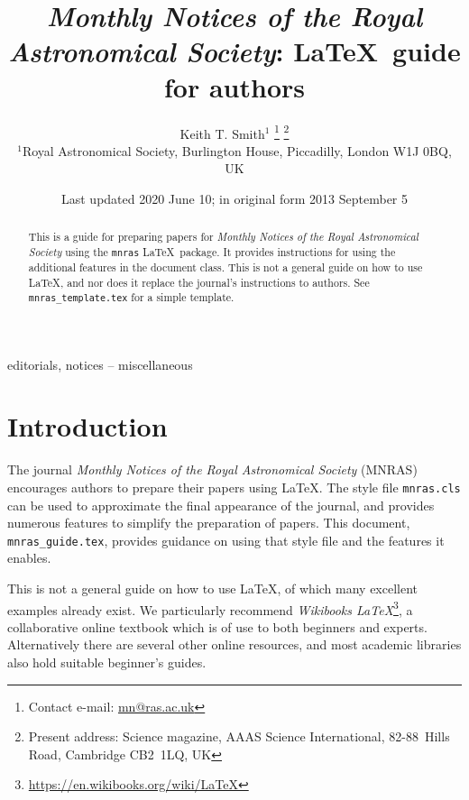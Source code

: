 \documentclass[fleqn,usenatbib,useAMS]{mnras}
\title[MNRAS \LaTeX\ guide for authors]{\textit{Monthly Notices of the Royal Astronomical
  Society}:  \LaTeX\ guide for authors}
\author[K. T. Smith]{Keith T. Smith$^{1}$%
\thanks{Contact e-mail: \href{mailto:mn@ras.ac.uk}{mn@ras.ac.uk}}%
\thanks{Present address: Science magazine, AAAS Science International, \mbox{82-88}~Hills Road, Cambridge CB2~1LQ, UK}%
\\
$^{1}$Royal Astronomical Society, Burlington House, Piccadilly, London W1J 0BQ, UK}
\date{Last updated 2020 June 10; in original form 2013 September 5}
\begin{document}
\label{firstpage}
\pagerange{\pageref{firstpage}--\pageref{lastpage}}
\maketitle

\begin{abstract}
This is a guide for preparing papers for \textit{Monthly Notices of the Royal Astronomical Society} using the \verb'mnras' \LaTeX\ package.
It provides instructions for using the additional features in the document class.
This is not a general guide on how to use \LaTeX, and nor does it replace the journal's instructions to authors.
See \texttt{mnras\_template.tex} for a simple template.
\end{abstract}

\begin{keywords}
editorials, notices -- miscellaneous
\end{keywords}



\begingroup
\let\clearpage\relax
\tableofcontents
\endgroup
\newpage

\section{Introduction}

The journal \textit{Monthly Notices of the Royal Astronomical Society} (MNRAS) encourages authors to prepare their papers using \LaTeX.
The style file \verb'mnras.cls' can be used to approximate the final appearance of the journal, and provides numerous features to simplify the preparation of papers.
This document, \verb'mnras_guide.tex', provides guidance on using that style file and the features it enables.

This is not a general guide on how to use \LaTeX, of which many excellent examples already exist.
We particularly recommend \textit{Wikibooks \LaTeX}\footnote{\url{https://en.wikibooks.org/wiki/LaTeX}}, a collaborative online textbook which is of use to both beginners and experts.
Alternatively there are several other online resources, and most academic libraries also hold suitable beginner's guides.
\end{document}
